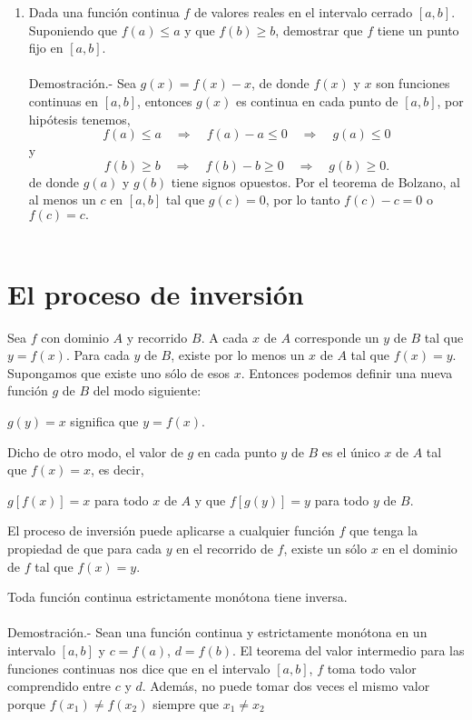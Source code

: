 \begin{enumerate}[\bfseries 1.]
    \item Dada una función continua $f$ de valores reales en el intervalo cerrado $[a,b]$. Suponiendo que $f(a)\leq a$ y que $f(b)\geq b$, demostrar que $f$ tiene un punto fijo en $[a,b]$.\\\\
	Demostración.-\;  Sea $g(x)=f(x)-x$, de donde $f(x)$ y $x$ son funciones continuas en $[a,b]$, entonces $g(x)$ es continua en cada punto de $[a,b]$, por hipótesis tenemos,
	$$f(a)\leq a \quad \Rightarrow \quad f(a)-a\leq 0 \quad \Rightarrow \quad g(a)\leq 0$$
	y
	$$f(b)\geq b \quad \Rightarrow \quad f(b)-b\geq 0 \quad \Rightarrow \quad g(b)\geq 0.$$
	de donde $g(a)$ y $g(b)$ tiene signos opuestos. Por el teorema de Bolzano, al al menos un $c$ en $[a,b]$ tal que $g(c)=0$, por lo tanto $f(c)-c=0$ o $f(c)=c.$\\\\

\end{enumerate}

\section{El proceso de inversión}

    \begin{def.}
	Sea $f$ con dominio $A$ y recorrido $B$. A cada $x$ de $A$ corresponde un $y$ de $B$ tal que $y=f(x)$. Para cada $y$ de $B$, existe por lo menos un $x$ de $A$ tal que $f(x)=y.$ Supongamos que existe uno sólo de esos $x$. Entonces podemos definir una nueva función $g$ de $B$ del modo siguiente:
	\begin{center}
	    $g(y)=x$ significa que $y=f(x).$
	\end{center}
	Dicho de otro modo, el valor de $g$ en cada punto $y$ de $B$ es el único $x$ de $A$ tal que $f(x)=x$, es decir,
	\begin{center}
	    $g[f(x)]=x$ para todo $x$ de $A$ y que $f[g(y)]=y$ para todo $y$ de $B$.
	\end{center}
	El proceso de inversión puede aplicarse a cualquier función $f$ que tenga la propiedad de que para cada $y$ en el recorrido de $f$, existe un sólo $x$ en el dominio de $f$ tal que $f(x)=y$.
    \end{def.}

\begin{lema}
    Toda función continua estrictamente monótona tiene inversa.\\\\
	Demostración.-\; Sean una función continua y estrictamente monótona en un intervalo $[a,b]$ y $c=f(a)$, $d=f(b)$. El teorema del valor intermedio para las funciones continuas nos dice que en el intervalo $[a,b]$, $f$ toma todo valor comprendido entre $c$ y $d$. Además, no puede tomar dos veces el mismo valor porque $f(x_1)\neq f(x_2)$ siempre que $x_1\neq x_2$
\end{lema}


